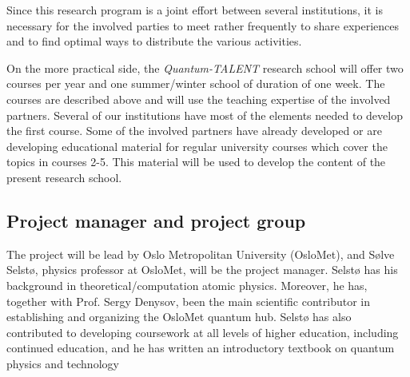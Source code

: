 \documentclass{scrreprt}
\begin{document}
Since this research program is a joint effort between several institutions, it is necessary for the involved parties to meet rather frequently to share experiences and to find optimal ways to distribute the various activities.

On the more practical side, the \textit{Quantum-TALENT} research school will offer two courses per year and one summer/winter school of duration of one week. The courses are described above and will use the teaching expertise of the involved partners. Several of our institutions have most of the elements needed to develop the first course. Some of the involved partners have already developed or are developing educational material for regular university courses which cover the topics in courses 2-5. 
This material will be used to develop the content of the present research school. 

\begin{comment}
\textit{The researcher school must be realistic and feasible, scientifically, organisationally, and in relation to planned use of resources. Please provide supplementary information that substantiates implementation capacity. Please describe
-	the planned organisation and implementation of the researcher school, including the planning of the individual components as well as the anticipated interaction between them;  
-	the management and organisation of the researcher school, including coordination, scientific management functions, relationship between the parties in the network and between the network, and the institutions’ doctoral degree programmes;  
-	the expertise and resources that will be available to the researcher school, including positions related the school (head coordinator etc.) and other types of contributions from the participating institutions (infrastructure etc.);
-	measures to improve gender balance and diversity, where relevant.}
\end{comment}

\subsection{Project manager and project group}
The project will be lead by Oslo Metropolitan University (OsloMet), and Sølve Selstø, physics professor at OsloMet, will be the project manager. Selstø has his background in theoretical/computation atomic physics. Moreover, he has, together with Prof. Sergy Denysov, been the main scientific contributor in establishing and organizing the OsloMet quantum hub.
Selstø has also contributed to developing coursework at all levels of higher education, including continued education, and he has written an introductory textbook on quantum physics and technology~\cite{Selsto2024}
\end{document}
